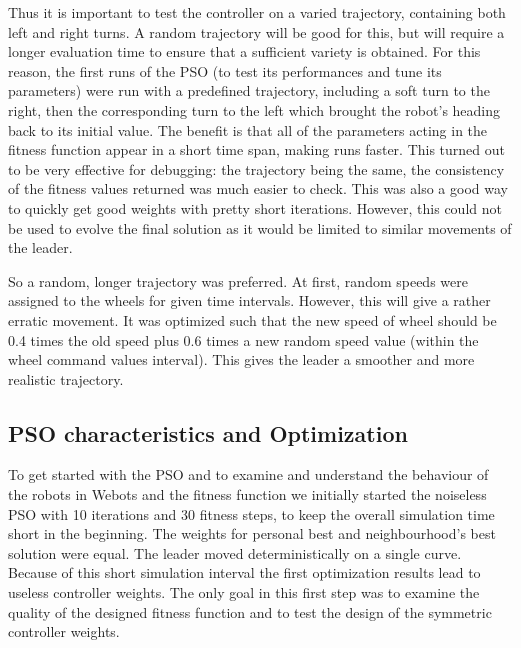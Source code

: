 \documentclass[a4paper, 10pt, conference]{ieeeconf}      %
\begin{document}
Thus it is important to test the controller on a varied trajectory, containing both left and right turns. A random trajectory will be good for this, but will require a longer evaluation time to ensure that a sufficient variety is obtained. For this reason, the first runs of the PSO (to test its performances and tune its parameters) were run with a predefined trajectory, including a soft turn to the right, then the corresponding turn to the left which brought the robot's heading back to its initial value. The benefit is that all of the parameters acting in the fitness function appear in a short time span, making runs faster. This turned out to be very effective for debugging: the trajectory being the same, the consistency of the fitness values returned was much easier to check. This was also a good way to quickly get good weights with pretty short iterations. However, this could not be used to evolve the final solution as it would be limited to similar movements of the leader.

So a random, longer trajectory was preferred. At first, random speeds were assigned to the wheels for given time intervals. However, this will give a rather erratic movement. It was optimized such that the new speed of wheel should be 0.4 times the old speed plus 0.6 times a new random speed value (within the wheel command values interval). This gives the leader a smoother and more realistic trajectory.

\subsection{PSO characteristics and Optimization}

To get started with the PSO and to examine and understand the behaviour of the robots in Webots and the fitness function we initially started the  noiseless PSO with 10 iterations and 30 fitness steps, to keep the overall simulation time short in the beginning. The weights for personal best and neighbourhood's best solution were equal. The leader moved deterministically on a single curve.  Because of this short simulation interval the first optimization results lead to useless controller weights. The only goal in this first step was to examine the quality of the designed fitness function and to test the design of the symmetric controller weights.
\end{document}
